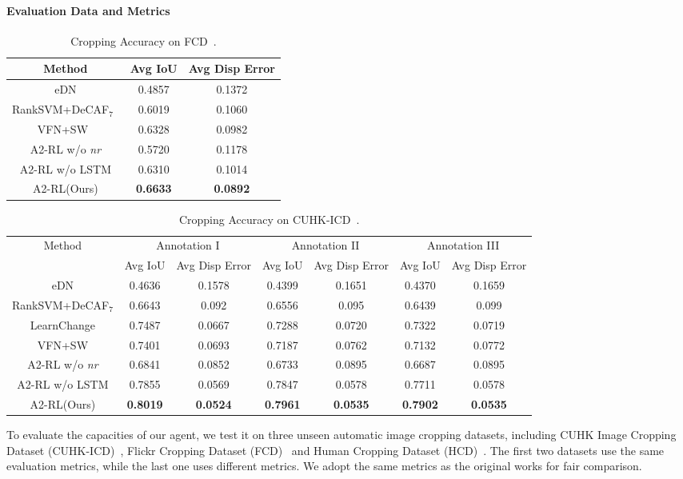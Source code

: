\documentclass[10pt,twocolumn,letterpaper]{article}
\begin{document}
\paragraph{Evaluation Data and Metrics}
\begin{table}
\centering
\begin{tabular}{c|c|c}\hline
Method&Avg IoU&Avg Disp Error\\\hline
eDN \cite{vig2014large}&0.4857&0.1372\\
RankSVM+DeCAF$_7$~\cite{chen2017quantitative}&0.6019&0.1060\\
VFN+SW~\cite{chen-acmmm-2017}&0.6328&0.0982\\\hline
A2-RL w/o \emph{nr}&0.5720&0.1178\\
A2-RL w/o LSTM&0.6310&0.1014\\
A2-RL(Ours)&\textbf{0.6633}&\textbf{0.0892}\\\hline
\end{tabular}

\centering
\caption{Cropping Accuracy on FCD~\cite{chen2017quantitative}.}
\label{FCDB}
\end{table}
\begin{table*}[t]
\centering
\begin{tabular}{c|c|c|c|c|c|c}\hline
\multirow{2}{*}{Method}&\multicolumn{2}{c|}{Annotation I}&\multicolumn{2}{c|}{Annotation II}&\multicolumn{2}{c}{Annotation III}\\
\cline{2-7}&Avg IoU&Avg Disp Error&Avg IoU&Avg Disp Error&Avg IoU&Avg Disp Error\\\hline
eDN \cite{vig2014large}&0.4636&0.1578&0.4399&0.1651&0.4370&0.1659\\
RankSVM+DeCAF$_7$ \cite{chen2017quantitative}&0.6643&0.092&0.6556&0.095&0.6439&0.099\\
LearnChange \cite{yan2013learning}&0.7487&0.0667&0.7288&0.0720&0.7322&0.0719\\
VFN+SW \cite{chen-acmmm-2017}&0.7401&0.0693&0.7187&0.0762&0.7132&0.0772\\\hline
A2-RL w/o \emph{nr}&0.6841&0.0852&0.6733&0.0895&0.6687&0.0895\\
A2-RL w/o LSTM&0.7855&0.0569&0.7847&0.0578&0.7711&0.0578\\
A2-RL(Ours)&\textbf{0.8019}&\textbf{0.0524}&\textbf{0.7961}&\textbf{0.0535}&\textbf{0.7902}&\textbf{0.0535}\\\hline
\end{tabular}

\caption{Cropping Accuracy on CUHK-ICD~\cite{yan2013learning}.}
\label{ICDB}
\end{table*}
To evaluate the capacities of our agent, we test it on three unseen automatic image cropping datasets, including CUHK Image Cropping Dataset (CUHK-ICD)~\cite{yan2013learning}, Flickr Cropping Dataset (FCD)~\cite{chen2017quantitative} and Human Cropping Dataset (HCD)~\cite{fang2014automatic}. The first two datasets use the same evaluation metrics, while the last one uses different metrics. We adopt the same metrics as the original works for fair comparison.
\end{document}
